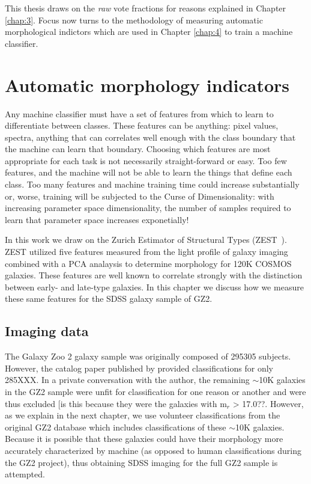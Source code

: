 This thesis draws on the \textit{raw} vote fractions for reasons explained in Chapter \ref{chap:3}. Focus now turns to the methodology of measuring automatic morphological indictors which are used in Chapter \ref{chap:4} to train a machine classifier. 

\section{Automatic morphology indicators}
Any machine classifier must have a set of features from which to learn to differentiate between classes. These features can be anything: pixel values, spectra, anything that can correlates well enough with the class boundary that the machine can learn that boundary. Choosing which features are most appropriate for each task is not necessarily straight-forward or easy. Too few features, and the machine will not be able to learn the things that define each class. Too many features and machine training time could increase substantially or, worse, training will be subjected to the Curse of Dimensionality: with increasing parameter space dimensionality, the number of samples required to learn that parameter space increases exponetially! 

In this work we draw on the Zurich Estimator of Structural Types (ZEST~\citep{Scarlata2007}). ZEST utilized five features measured from the light profile of galaxy imaging combined with a PCA analaysis to determine morphology for 120K COSMOS galaxies. These features are well known to correlate strongly with the distinction between early- and late-type galaxies. In this chapter we discuss how we measure these same features for the SDSS galaxy sample of GZ2. 

\subsection{Imaging data}
The Galaxy Zoo 2 galaxy sample was originally composed of 295305 subjects. However, the catalog paper published by \cite{Willett2013} provided classifications for only 285XXX. In a private conversation with the author, the remaining $\sim$10K galaxies in the GZ2 sample were unfit for classification for one reason or another and were thus excluded [is this because they were the galaxies with m$_r$ > 17.0??. However, as we explain in the next chapter, we use volunteer classifications from the original GZ2 database which includes classifications of these $\sim$10K galaxies. Because it is possible that these galaxies could have their morphology more accurately characterized by machine (as opposed to human classifications during the GZ2 project), thus obtaining SDSS imaging for the full GZ2 sample is attempted.  


